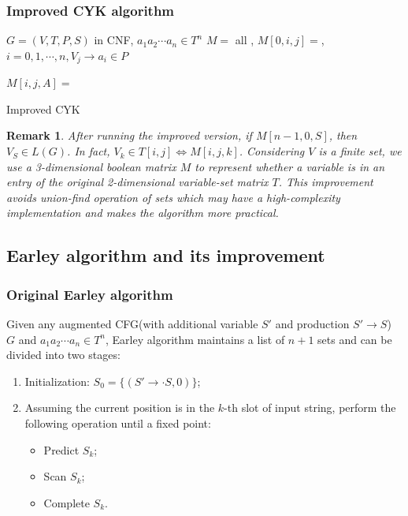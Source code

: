 \documentclass{beamer}
\newtheorem{remark}[theorem]{Remark}
\begin{document}
\begin{frame}
\frametitle{Improved CYK algorithm}
\begin{algorithm}[H]
\begin{algorithmic}[1]

\REQUIRE $G=(V,T,P,S)$ in CNF, $a_1a_2\cdots a_n\in T^n$
\ENSURE $M=$ all \FALSE, $M[0,i,j]=$\TRUE, $i=0,1,\cdots,n,V_j\to a_i\in P$

					\STATE $M[i,j,A]=$\TRUE
				\ENDIF
			\ENDFOR
		\ENDFOR
	\ENDFOR
\ENDFOR

\end{algorithmic}
\caption{Improved CYK}
\label{alg:improved_cyk}
\end{algorithm}
\end{frame}

\begin{frame}
\begin{remark}
After running the improved version, if $M[n-1,0,S]$, then $V_S\in L(G)$. In fact, $V_k\in T[i,j] \iff M[i,j,k]$. Considering $V$ is a finite set, we use a 3-dimensional boolean matrix $M$ to represent whether a variable is in an entry of the original 2-dimensional variable-set matrix $T$. This improvement avoids union-find operation of sets which may have a high-complexity implementation and makes the algorithm more practical.
\end{remark}
\end{frame}

\subsection{Earley algorithm and its improvement}
\begin{frame}
\frametitle{Original Earley algorithm}
Given any augmented CFG(with additional variable $S'$ and production $S'\to S$) $G$ and $a_1a_2\cdots a_n\in T^n$, Earley algorithm\cite{earley} maintains a list of $n+1$ sets and can be divided into two stages:
\begin{enumerate}
\item Initialization: $S_0=\{(S'\to\cdot S, 0) \} $;
\item Assuming the current position is in the $k$-th slot of input string, perform the following operation until a fixed point:
\begin{itemize}
\item Predict $S_k$;
\item Scan $S_k$;
\item Complete $S_k$.
\end{itemize}
\end{enumerate}
\end{frame}
\end{document}
